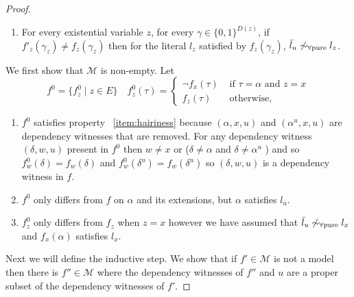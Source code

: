 \documentclass[runningheads]{llncs}
\newcommand{\mpool}{\mathcal{M}}
\DeclareMathOperator*{\var}{\operatorname{var}}
\newcommand{\pusim}{\ensuremath{\sim_{\mbox{\scriptsize \upshape $\forall$pure}}}}
\newcommand{\pathc}[1]{\ensuremath{\mathfrak{C}^{\mbox{\scriptsize \upshape #1}}}\xspace}
\newcommand{\pathl}[1]{\ensuremath{\mathfrak{L}^{\mbox{\scriptsize \upshape #1}}}\xspace}
\newcommand{\pathcpu}{\pathc{$\forall$pure}}
\newcommand{\pathlpu}{\pathl{$\forall$pure}}
\begin{document}
\begin{proof}
\begin{enumerate}
			\label{item:assignment}
			\item For every existential variable $z$, for every $\gamma \in \{0,1\}^{D(z)}$, if  
			$f'_z (\gamma_z) \neq f_z(\gamma_z)$  then
			for the literal $l_z$ satisfied by $f_z(\gamma_z)$, %
			$\bar l_u \not \pusim l_z$.
			\label{item:path}
		\end{enumerate}
		We first show that $\mpool$ is non-empty. Let
			\[ f^0=\{f^0_z \mid z \in E \}\quad
				f^0_z(\tau) = \begin{cases}
						\neg f_x(\tau) & \text{ if } \tau = \alpha \text{ and } z=x\\
						f_z (\tau)     & \text{ otherwise,}
					\end{cases}
			\]
		\begin{enumerate}
		\item
		$f^0$ satisfies property~%
		\ref{item:hairiness} because $(\alpha, x, u)$ and $(\alpha^u, x, u)$ are dependency witnesses that are removed. 
		For any dependency witness $(\delta, w, u)$ present in $f^0$ then $w\neq x$ or ($\delta\neq \alpha$ and $\delta\neq \alpha^u$ ) and so $f^0_w(\delta)=f_w(\delta)$ and $f^0_w(\delta^u)=f_w(\delta^u)$ so $(\delta, w, u)$ is a dependency witness in $f$.
		\item $f^0$ only differs from $f$ on $\alpha$ and its extensions, but $\alpha$ satisfies $l_u$.
		\item $f_z^0$ only differs from $f_z$ when $z=x$ however we have assumed that $\bar l_u \not \pusim l_x$ and $f_x(\alpha)$ satisfies $l_x$. 
		\end{enumerate}
		Next we will define the inductive step. We show that if $f'\in \mpool$ is not a model then there is $f''\in \mpool$ where the dependency witnesses of $f''$ and $u$ are a proper subset of the dependency witnesses of $f'$.
		

\end{proof}
\end{document}
